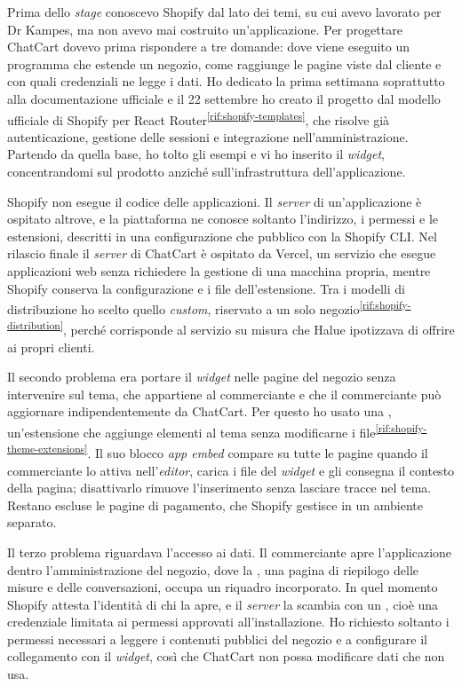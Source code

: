 Prima dello \emph{stage} conoscevo Shopify dal lato dei temi, su cui avevo lavorato per Dr Kampes,
ma non avevo mai costruito un’applicazione. Per progettare ChatCart dovevo prima rispondere a tre
domande: dove viene eseguito un programma che estende un negozio, come raggiunge le pagine viste dal
cliente e con quali credenziali ne legge i dati. Ho dedicato la prima settimana soprattutto alla
documentazione ufficiale e il 22 settembre ho creato il progetto dal modello ufficiale di Shopify
per React Router\textsuperscript{\ref{rif:shopify-templates}}, che risolve già autenticazione,
gestione delle sessioni e integrazione nell’amministrazione. Partendo da quella base, ho tolto gli
esempi e vi ho inserito il \emph{widget}, concentrandomi sul prodotto anziché sull’infrastruttura
dell’applicazione.

Shopify non esegue il codice delle applicazioni. Il \emph{server} di un’applicazione è ospitato
altrove, e la piattaforma ne conosce soltanto l’indirizzo, i permessi e le estensioni, descritti in
una configurazione che pubblico con la Shopify CLI. Nel rilascio finale il \emph{server} di ChatCart
è ospitato da Vercel, un servizio che esegue applicazioni web senza richiedere la gestione di una
macchina propria, mentre Shopify conserva la configurazione e i file dell’estensione. Tra i modelli
di distribuzione ho scelto quello \emph{custom}, riservato a un solo
negozio\textsuperscript{\ref{rif:shopify-distribution}}, perché corrisponde al servizio su misura
che Halue ipotizzava di offrire ai propri clienti.

Il secondo problema era portare il \emph{widget} nelle pagine del negozio senza intervenire sul
tema, che appartiene al commerciante e che il commerciante può aggiornare indipendentemente da
ChatCart. Per questo ho usato una ,
un’estensione che aggiunge elementi al tema senza modificarne i
file\textsuperscript{\ref{rif:shopify-theme-extensions}}. Il suo blocco \emph{app embed} compare su
tutte le pagine quando il commerciante lo attiva nell’\emph{editor}, carica i file del \emph{widget}
e gli consegna il contesto della pagina; disattivarlo rimuove l’inserimento senza lasciare tracce
nel tema. Restano escluse le pagine di pagamento, che Shopify gestisce in un ambiente separato.

Il terzo problema riguardava l’accesso ai dati. Il commerciante apre l’applicazione dentro
l’amministrazione del negozio, dove la , una pagina di riepilogo
delle misure e delle conversazioni, occupa un riquadro incorporato. In quel momento Shopify attesta
l’identità di chi la apre, e il \emph{server} la scambia con un , cioè una credenziale limitata ai permessi approvati all’installazione. Ho richiesto
soltanto i permessi necessari a leggere i contenuti pubblici del negozio e a configurare il
collegamento con il \emph{widget}, così che ChatCart non possa modificare dati che non usa.

